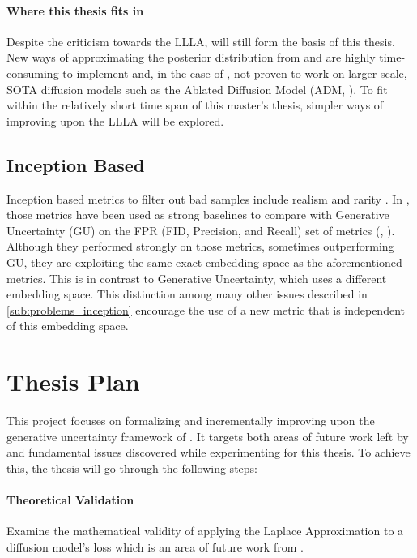 \paragraph{Where this thesis fits in}
Despite the criticism towards the \acs{LLLA}, \cite{jazbec_generative_2025} will still form the basis of this thesis. New ways of approximating the posterior distribution from \cite{gegenfurtner_reducing_2026} and \cite{gupta_quantifying_2026} are highly time-consuming to implement and, in the case of \cite{gupta_quantifying_2026}, not proven to work on larger scale, \acs{SOTA} diffusion models such as the Ablated Diffusion Model (\acs{ADM}, \cite{dhariwal_diffusion_2021}). To fit within the relatively short time span of this master's thesis, simpler ways of improving upon the \acs{LLLA} will be explored.

\subsection{Inception Based}

Inception based metrics to filter out bad samples include realism \parencite{kynkaanniemi_improved_2019} and rarity \parencite{han_rarity_2022}. 
In \cite{jazbec_generative_2025}, those metrics have been used as strong baselines to compare with Generative Uncertainty (\acs{GU}) on the \acs{FPR} (FID, Precision, and Recall) set of metrics (\cite{heusel_gans_2018}, \cite{kynkaanniemi_improved_2019}). Although they performed strongly on those metrics, sometimes outperforming \acs{GU}, they are exploiting the same exact embedding space as the aforementioned metrics. 
This is in contrast to Generative Uncertainty, which uses a different embedding space. This distinction among many other issues described in \autoref{sub:problems_inception} encourage the use of a new metric that is independent of this embedding space.

\section{Thesis Plan}

This project focuses on formalizing and incrementally improving upon the generative uncertainty framework of \cite{jazbec_generative_2025}. 
It targets both areas of future work left by \cite{jazbec_generative_2025} and fundamental issues discovered while experimenting for this thesis.
To achieve this, the thesis will go through the following steps:

\paragraph{Theoretical Validation} Examine the mathematical validity of applying the Laplace Approximation to a diffusion model's loss which is an area of future work from \cite{jazbec_generative_2025}.

